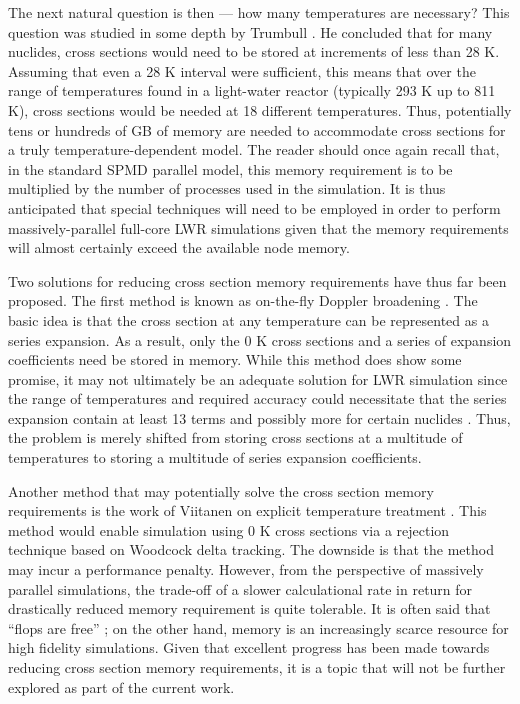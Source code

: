 The next natural question is then --- how many temperatures are necessary? This
question was studied in some depth by Trumbull \cite{nt-trumbull-2006}. He
concluded that for many nuclides, cross sections would need to be stored at
increments of less than 28 K. Assuming that even a 28 K interval were
sufficient, this means that over the range of temperatures found in a
light-water reactor (typically 293 K up to 811 K), cross sections would be
needed at 18 different temperatures. Thus, potentially tens or hundreds of GB of
memory are needed to accommodate cross sections for a truly
temperature-dependent model. The reader should once again recall that, in the
standard SPMD parallel model, this memory requirement is to be multiplied by the
number of processes used in the simulation. It is thus anticipated that special
techniques will need to be employed in order to perform massively-parallel
full-core LWR simulations given that the memory requirements will almost
certainly exceed the available node memory.

Two solutions for reducing cross section memory requirements have thus far been
proposed. The first method is known as on-the-fly Doppler broadening
\cite{nse-yesilyurt-2012, trans-brown-2012}. The basic idea is that the cross
section at any temperature can be represented as a series expansion. As a
result, only the 0 K cross sections and a series of expansion coefficients need
be stored in memory. While this method does show some promise, it may not
ultimately be an adequate solution for LWR simulation since the range of
temperatures and required accuracy could necessitate that the series expansion
contain at least 13 terms and possibly more for certain nuclides
\cite{net-martin-2012}. Thus, the problem is merely shifted from storing cross
sections at a multitude of temperatures to storing a multitude of series
expansion coefficients.

Another method that may potentially solve the cross section memory requirements
is the work of Viitanen on explicit temperature treatment
\cite{nse-viitanen-2012}. This method would enable simulation using 0 K cross
sections via a rejection technique based on Woodcock delta tracking. The
downside is that the method may incur a performance penalty. However, from the
perspective of massively parallel simulations, the trade-off of a slower
calculational rate in return for drastically reduced memory requirement is quite
tolerable. It is often said that ``flops are free'' \cite{sc-panel-2009}; on the
other hand, memory is an increasingly scarce resource for high fidelity
simulations. Given that excellent progress has been made towards reducing cross
section memory requirements, it is a topic that will not be further explored as
part of the current work.

